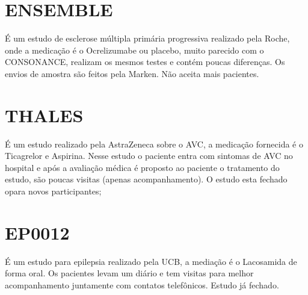 \section{ENSEMBLE}

É um estudo de esclerose múltipla primária progressiva realizado pela Roche, onde a medicação é o Ocrelizumabe ou placebo, muito parecido com o CONSONANCE, realizam os mesmos testes e contém poucas diferenças. Os envios de amostra são feitos pela Marken. Não aceita mais pacientes. 

\section{THALES} 

É um estudo realizado pela AstraZeneca sobre o AVC, a medicação fornecida é o Ticagrelor e Aspirina. Nesse estudo o paciente entra com sintomas de AVC no hospital e após a avaliação médica é proposto ao paciente o tratamento do estudo, são poucas visitas (apenas acompanhamento). O estudo esta fechado opara novos participantes;

\section{EP0012}

É um estudo para epilepsia realizado pela UCB, a mediação é o Lacosamida de forma oral. Os pacientes levam um diário e tem visitas para melhor acompanhamento juntamente com contatos telefônicos. Estudo já fechado. 
